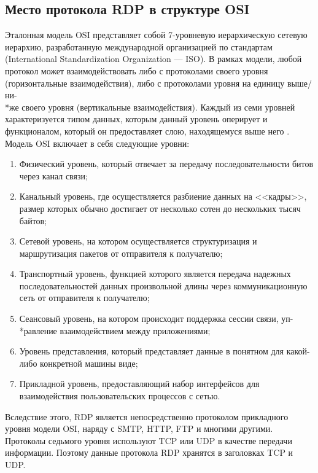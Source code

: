 \documentclass[bachelor, och, coursework]{SCWorks}
\begin{document}
  \subsection{Место протокола RDP в структуре OSI}

    Эталонная модель OSI представляет собой 7-уровневую иерархическую сетевую иерархию, разработанную международной организацией по стандартам
    (International Standardization Organization --- ISO). В рамках модели, любой протокол может взаимодействовать либо с протоколами своего
    уровня (горизонтальные взаимодействия), либо с протоколами уровня на единицу выше/ни-\\*же своего уровня (вертикальные взаимодействия).
    Каждый из семи уровней характеризуется типом данных, которым данный уровень оперирует и функционалом, который он предоставляет слою,
    находящемуся выше него \cite{osi-model}. Модель OSI включает в себя следующие уровни:

    \begin{enumerate}
      \item Физический уровень, который отвечает за передачу последовательности битов через канал связи;
      \item Канальный уровень, где осуществляется разбиение данных на <<кадры>>, размер которых обычно достигает
      от несколько сотен до нескольких тысяч байтов;
      \item Сетевой уровень, на котором осуществляется структуризация и маршрутизация пакетов от отправителя к получателю;
      \item Транспортный уровень, функцией которого является передача надежных последовательностей данных произвольной
      длины через коммуникационную сеть от отправителя к получателю;
      \item Сеансовый уровень, на котором происходит поддержка сессии связи, уп-\\*равление взаимодействием между приложениями;  
      \item Уровень представления, который представляет данные в понятном для какой-либо конкретной машины виде;
      \item Прикладной уровень, предоставляющий набор интерфейсов для взаимодействия пользовательских процессов с сетью.
    \end{enumerate}

    Вследствие этого, RDP является непосредственно протоколом прикладного уровня модели OSI, наряду с SMTP, HTTP, FTP и многими другими. 
    Протоколы седьмого уровня используют TCP или UDP в качестве передачи информации. Поэтому данные протокола RDP хранятся в заголовках TCP и
    UDP. 
    
\end{document}
